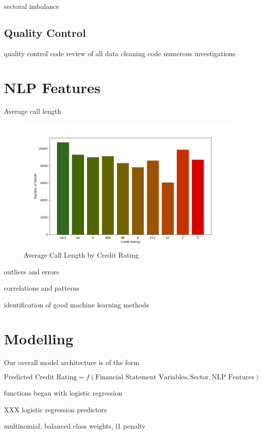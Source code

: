 \documentclass{article}
\begin{document}
    sectoral imbalance    

    \subsection*{Quality Control}

    quality control
    code review of all data cleaning code
    numerous investigations

    \section*{NLP Features}

    Average call length

    \begin{figure}[h!]
		\centering
        \caption{Average Call Length by Credit Rating}
        \includegraphics[width=0.5\linewidth,keepaspectratio=true]{../Output/All Data EDA/NLP EDA/all_data_call_length_by_credit_rating_no_title.png}
	\end{figure}

    outliers and errors

    correlations and patterns

    identification of good machine learning methods

    \section*{Modelling}

    Our overall model architecture is of the form

    \begin{equation*}
        \text{Predicted Credit Rating} = f(\text{Financial Statement Variables}, \text{Sector}, \text{NLP Features})
    \end{equation*}

    functions began with logistic regression

    XXX logistic regression predictors

    multinomial, balanced class weights, l1 penalty
\end{document}
